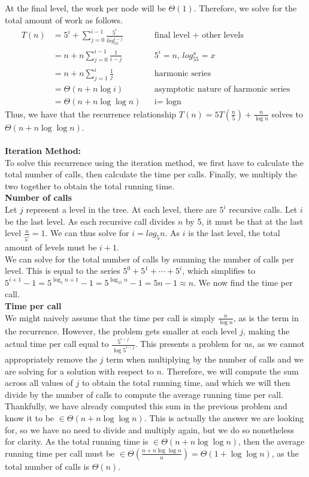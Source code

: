 \documentclass{article}
\begin{document}
\begin{enumerate}
\begin{enumerate}
At the final level, the work per node will be $\Theta(1)$. Therefore, we solve for the total amount of work as follows. 
\begin{align}
T(n) &= 5^i + \sum_{j=0}^{i-1} \frac{5^i}{log_55^{i-j}} && \text{final level + other levels } \\
&= n + n \sum_{j=0}^{i-1} \frac{1}{i-j} && \text{$5^i=n$, $log_55^x=x$} \\
&= n + n \sum_{j=1}^{i} \frac{1}{j} && \text{harmonic series} \\
&= \Theta(n+n\log i) && \text{asymptotic nature of harmonic series} \\
&= \Theta(n+n\log \log n) && \text{i= logn}
\end{align}
Thus, we have that the recurrence relationship $T(n)=5T(\frac{n}{5})+\frac{n}{\log n}$ solves to $\Theta(n+n\log \log n)$.
\\ \\ \textbf{Iteration Method:}
\\ To solve this recurrence using the iteration method, we first have to calculate the total number of calls, then calculate the time per calls. Finally, we multiply the two together to obtain the total running time.
\\ \textbf{Number of calls}
\\ Let $j$ represent a level in the tree. At each level, there are $5^i$ recursive calls. Let $i$ be the last level. As each recursive call divides $n$ by 5, it must be that at the last level $\frac{n}{5^i}=1$. We can thus solve for $i=log_5n$. As $i$ is the last level, the total amount of levels must be $i+1$. 
\\ We can solve for the total number of calls by summing the number of calls per level. This is equal to the series $5^0+5^1+\cdots+ 5^i$, which simplifies to $5^{i+1}-1=5^{\log_5n+1}-1= 5^{\log_55n}-1= 5n-1\approx n$. We now find the time per call.
\\ \textbf{Time per call}
\\ We might naively assume that the time per call is simply $\frac{n}{\log n}$, as is the term in the recurrence. However, the problem gets smaller at each level $j$, making the actual time per call equal to $\frac{5^{i-j}}{\log 5^{i-j}}$. This presents a problem for us, as we cannot appropriately remove the $j$ term when multiplying by the number of calls and we are solving for a solution with respect to $n$. Therefore, we will compute the sum across all values of $j$ to obtain the total running time, and which we will then divide by the number of calls to compute the average running time per call. Thankfully, we have already computed this sum in the previous problem and know it to be $\in \Theta(n+n\log \log n)$. This is actually the answer we are looking for, so we have no need to divide and multiply again, but we do so nonetheless for clarity. As the total running time is $\in \Theta(n+n\log \log n)$, then the average running time per call must be $\in \Theta(\frac{n+n\log \log n}{n})=\Theta(1+\log \log n)$, as the total number of calls is $\Theta(n)$.

\end{enumerate}
\end{enumerate}
\end{document}
